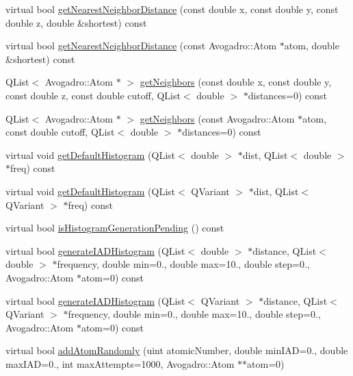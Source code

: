 \begin{DoxyCompactItemize}
\item 
virtual bool \hyperlink{classGlobalSearch_1_1Structure_af90032040343059ebbc91ac294a0a020}{get\+Nearest\+Neighbor\+Distance} (const double x, const double y, const double z, double \&shortest) const 
\item 
virtual bool \hyperlink{classGlobalSearch_1_1Structure_af7280b04c20689040bb7bc69005aef49}{get\+Nearest\+Neighbor\+Distance} (const Avogadro\+::\+Atom $\ast$atom, double \&shortest) const 
\item 
Q\+List$<$ Avogadro\+::\+Atom $\ast$ $>$ \hyperlink{classGlobalSearch_1_1Structure_a741bc226576a6aebdc72573afec08fe2}{get\+Neighbors} (const double x, const double y, const double z, const double cutoff, Q\+List$<$ double $>$ $\ast$distances=0) const 
\item 
Q\+List$<$ Avogadro\+::\+Atom $\ast$ $>$ \hyperlink{classGlobalSearch_1_1Structure_af84f72e94d8961a8804ff38b0c20b785}{get\+Neighbors} (const Avogadro\+::\+Atom $\ast$atom, const double cutoff, Q\+List$<$ double $>$ $\ast$distances=0) const 
\item 
virtual void \hyperlink{classGlobalSearch_1_1Structure_a668fcf6ecb33ad5fd3ef9963dd059ce0}{get\+Default\+Histogram} (Q\+List$<$ double $>$ $\ast$dist, Q\+List$<$ double $>$ $\ast$freq) const 
\item 
virtual void \hyperlink{classGlobalSearch_1_1Structure_a15748e6ccd1971f70dcf24d26a07388f}{get\+Default\+Histogram} (Q\+List$<$ Q\+Variant $>$ $\ast$dist, Q\+List$<$ Q\+Variant $>$ $\ast$freq) const 
\item 
virtual bool \hyperlink{classGlobalSearch_1_1Structure_a18edce7ebc0e1f5d0f939369a737c778}{is\+Histogram\+Generation\+Pending} () const 
\item 
virtual bool \hyperlink{classGlobalSearch_1_1Structure_a39c00be4b7081dea0963a9183c5d8d36}{generate\+I\+A\+D\+Histogram} (Q\+List$<$ double $>$ $\ast$distance, Q\+List$<$ double $>$ $\ast$frequency, double min=0., double max=10., double step=0., Avogadro\+::\+Atom $\ast$atom=0) const 
\item 
virtual bool \hyperlink{classGlobalSearch_1_1Structure_a6009cbdb3990eba689cbdd27aa0305ea}{generate\+I\+A\+D\+Histogram} (Q\+List$<$ Q\+Variant $>$ $\ast$distance, Q\+List$<$ Q\+Variant $>$ $\ast$frequency, double min=0., double max=10., double step=0., Avogadro\+::\+Atom $\ast$atom=0) const 
\item 
virtual bool \hyperlink{classGlobalSearch_1_1Structure_a8e0db651a3a48cd249f13f3ae0ca2b68}{add\+Atom\+Randomly} (uint atomic\+Number, double min\+I\+A\+D=0., double max\+I\+A\+D=0., int max\+Attempts=1000, Avogadro\+::\+Atom $\ast$$\ast$atom=0)
$$
\end{DoxyCompactItemize}
